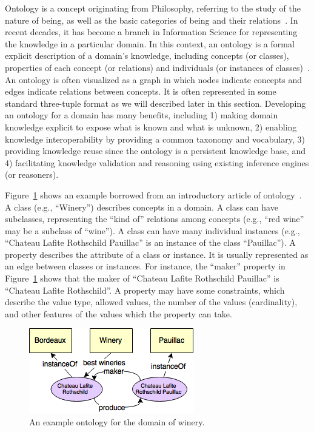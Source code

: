 Ontology is a concept originating from Philosophy, referring to the
study of the nature of being, as well as the basic categories of being
and their relations~\cite{noy2001ontology}. In recent decades, it has
become a branch in Information Science for representing the knowledge
in a particular domain. In this context, 
an ontology is a formal explicit
description of a domain's knowledge, including concepts (or classes), properties of each concept 
(or relations)
and individuals (or instances of classes)~\cite{staab2013handbook}.
An ontology is often visualized as a graph in which nodes indicate
concepts and edges indicate relations between concepts. It is often
represented in some standard three-tuple format as we will described
later in this section.  Developing an ontology for a domain has many
benefits, including 1) making domain knowledge explicit to expose what
is known and what is unknown, 2) enabling knowledge interoperability
by providing a common taxonomy and vocabulary, 3) providing knowledge
reuse since the ontology is a persistent knowledge base, and 4)
facilitating knowledge validation and reasoning using existing
inference engines (or reasoners).

Figure~\ref{fig:wine} shows an example borrowed from an introductory
article of ontology~\cite{noy2001ontology}. A class (e.g., ``Winery'')
describes concepts in a domain. A class can have subclasses,
representing the ``kind of'' relations among concepts (e.g., ``red
wine'' may be a subclass of ``wine'').  A class can have many
individual instances (e.g., ``Chateau Lafite Rothschild Pauillac'' is
an instance of the class ``Pauillac''). A property describes the
attribute of a class or instance. It is usually represented as an edge
between classes or instances. For instance, the ``maker'' property in
Figure~\ref{fig:wine} shows that the maker of ``Chateau Lafite
Rothschild Pauillac'' is ``Chateau Lafite Rothschild''. A property may
have some constraints, which describe the value type, allowed values,
the number of the values (cardinality), and other features of the
values which the property can take.

\begin{figure}[hb]
\centering
\includegraphics[width=.4\columnwidth]{graph/wine.png}
\caption{An example ontology for the domain of winery.}
\label{fig:wine}
\end{figure}

